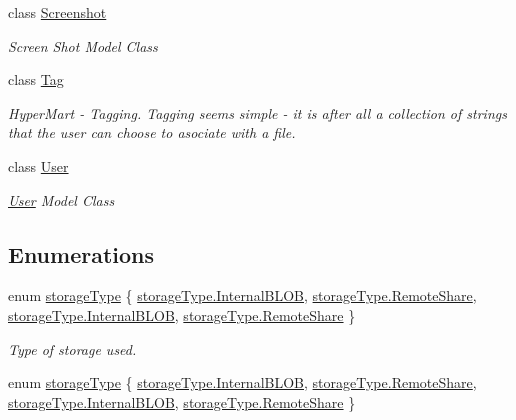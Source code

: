 \begin{DoxyCompactItemize}
class \hyperlink{class_open_1_1_g_i_1_1hypermart_1_1_models_1_1_screenshot}{Screenshot}
\begin{DoxyCompactList}\small\item\em Screen Shot Model Class \end{DoxyCompactList}\item 
class \hyperlink{class_open_1_1_g_i_1_1hypermart_1_1_models_1_1_tag}{Tag}
\begin{DoxyCompactList}\small\item\em Hyper\+Mart -\/ Tagging. Tagging seems simple -\/ it is after all a collection of strings that the user can choose to asociate with a file. \end{DoxyCompactList}\item 
class \hyperlink{class_open_1_1_g_i_1_1hypermart_1_1_models_1_1_user}{User}
\begin{DoxyCompactList}\small\item\em \hyperlink{class_open_1_1_g_i_1_1hypermart_1_1_models_1_1_user}{User} Model Class \end{DoxyCompactList}\end{DoxyCompactItemize}
\subsection*{Enumerations}
\begin{DoxyCompactItemize}
\item 
enum \hyperlink{namespace_open_1_1_g_i_1_1hypermart_1_1_models_a21c5ffa7da75ad8a6d2b04798113f9db}{storage\+Type} \{ \hyperlink{namespace_open_1_1_g_i_1_1hypermart_1_1_models_a21c5ffa7da75ad8a6d2b04798113f9dba8f87bf12722bc0a9f85e6e26a5ea44ae}{storage\+Type.\+Internal\+B\+L\+O\+B}, 
\hyperlink{namespace_open_1_1_g_i_1_1hypermart_1_1_models_a21c5ffa7da75ad8a6d2b04798113f9dba3631a3e39fc04e9ba7977a14b6e20308}{storage\+Type.\+Remote\+Share}, 
\hyperlink{namespace_open_1_1_g_i_1_1hypermart_1_1_models_a21c5ffa7da75ad8a6d2b04798113f9dba8f87bf12722bc0a9f85e6e26a5ea44ae}{storage\+Type.\+Internal\+B\+L\+O\+B}, 
\hyperlink{namespace_open_1_1_g_i_1_1hypermart_1_1_models_a21c5ffa7da75ad8a6d2b04798113f9dba3631a3e39fc04e9ba7977a14b6e20308}{storage\+Type.\+Remote\+Share}
 \}\begin{DoxyCompactList}\small\item\em Type of storage used. \end{DoxyCompactList}
\item 
enum \hyperlink{namespace_open_1_1_g_i_1_1hypermart_1_1_models_a21c5ffa7da75ad8a6d2b04798113f9db}{storage\+Type} \{ \hyperlink{namespace_open_1_1_g_i_1_1hypermart_1_1_models_a21c5ffa7da75ad8a6d2b04798113f9dba8f87bf12722bc0a9f85e6e26a5ea44ae}{storage\+Type.\+Internal\+B\+L\+O\+B}, 
\hyperlink{namespace_open_1_1_g_i_1_1hypermart_1_1_models_a21c5ffa7da75ad8a6d2b04798113f9dba3631a3e39fc04e9ba7977a14b6e20308}{storage\+Type.\+Remote\+Share}, 
\hyperlink{namespace_open_1_1_g_i_1_1hypermart_1_1_models_a21c5ffa7da75ad8a6d2b04798113f9dba8f87bf12722bc0a9f85e6e26a5ea44ae}{storage\+Type.\+Internal\+B\+L\+O\+B}, 
\hyperlink{namespace_open_1_1_g_i_1_1hypermart_1_1_models_a21c5ffa7da75ad8a6d2b04798113f9dba3631a3e39fc04e9ba7977a14b6e20308}{storage\+Type.\+Remote\+Share}
 \}
\end{DoxyCompactItemize}


